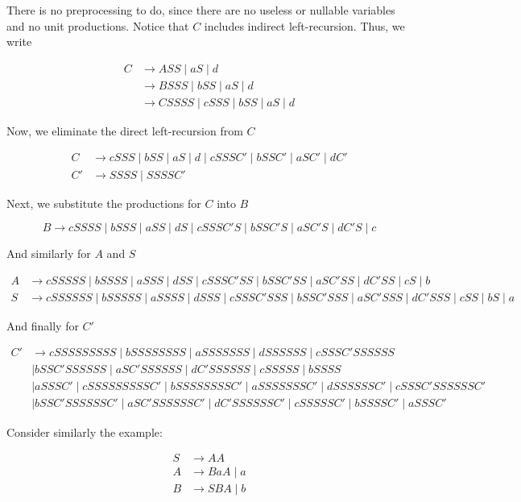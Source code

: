 There is no preprocessing to do, since there are no useless or nullable variables and no unit productions. Notice that \(C\) includes indirect left-recursion. Thus, we write 

\begin{align*}
    C &\to ASS\mid aS\mid d\\
      &\to BSSS\mid bSS \mid aS\mid d\\
      &\to CSSSS\mid cSSS\mid bSS\mid aS\mid d
\end{align*}

Now, we eliminate the direct left-recursion from \(C\)

\begin{align*}
    C &\to cSSS\mid bSS\mid aS\mid d\mid cSSSC'\mid bSSC'\mid aSC'\mid dC'\\
    C' &\to SSSS\mid SSSSC'
\end{align*}

Next, we substitute the productions for \(C\) into \(B\)

\[B\to cSSSS\mid bSSS\mid aSS\mid dS\mid cSSSC'S\mid bSSC'S\mid aSC'S\mid dC'S\mid c\]

And similarly for \(A\) and \(S\)

\begin{align*}A&\to cSSSSS\mid bSSSS\mid aSSS\mid dSS\mid cSSSC'SS\mid bSSC'SS\mid aSC'SS\mid dC'SS\mid cS\mid b\\
S&\to cSSSSSS\mid bSSSSS\mid aSSSS\mid dSSS\mid cSSSC'SSS\mid bSSC'SSS\mid aSC'SSS\mid dC'SSS\mid cSS\mid bS\mid a\end{align*}

And finally for \(C'\)

\begin{align*}C'&\to cSSSSSSSSS\mid bSSSSSSSS\mid aSSSSSSS\mid dSSSSSS\mid cSSSC'SSSSSS\\&\mid bSSC'SSSSSS\mid aSC'SSSSSS\mid dC'SSSSSS\mid cSSSSS\mid bSSSS\\&\mid aSSSC'\mid cSSSSSSSSSC'\mid bSSSSSSSSC'\mid aSSSSSSSC'\mid dSSSSSSC'\mid cSSSC'SSSSSSC'\\&\mid bSSC'SSSSSSC'\mid aSC'SSSSSSC'\mid dC'SSSSSSC'\mid cSSSSSC'\mid bSSSSC'\mid aSSSC'\end{align*}

Consider similarly the example:

\begin{align*}
    S &\to AA\\
    A &\to BaA\mid a\\
    B &\to SBA\mid b
\end{align*}

